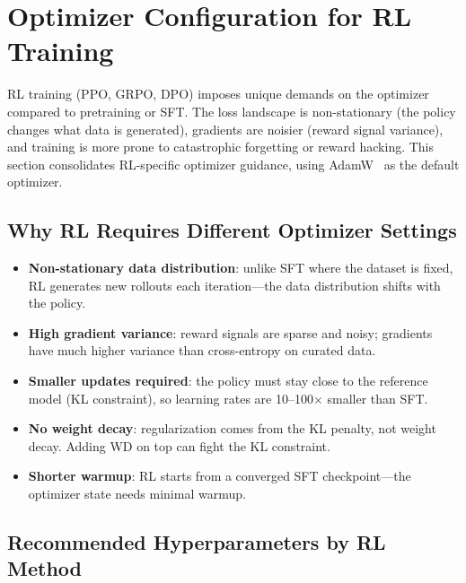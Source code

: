 \section{Optimizer Configuration for RL Training}
\label{sec:rl-optimizer-config}

RL training (PPO, GRPO, DPO) imposes unique demands on the optimizer compared to pretraining or SFT. The loss landscape is non-stationary (the policy changes what data is generated), gradients are noisier (reward signal variance), and training is more prone to catastrophic forgetting or reward hacking. This section consolidates RL-specific optimizer guidance, using AdamW~\cite{loshchilov2019adamw} as the default optimizer.

\subsection{Why RL Requires Different Optimizer Settings}
\label{why-rl-requires-different-optimizer-settings}

\begin{keybox}
\begin{itemize}
  \item \textbf{Non-stationary data distribution}: unlike SFT where the dataset is fixed, RL generates new rollouts each iteration---the data distribution shifts with the policy.
  \item \textbf{High gradient variance}: reward signals are sparse and noisy; gradients have much higher variance than cross-entropy on curated data.
  \item \textbf{Smaller updates required}: the policy must stay close to the reference model (KL constraint), so learning rates are 10--100$\times$ smaller than SFT.
  \item \textbf{No weight decay}: regularization comes from the KL penalty, not weight decay. Adding WD on top can fight the KL constraint.
  \item \textbf{Shorter warmup}: RL starts from a converged SFT checkpoint---the optimizer state needs minimal warmup.
\end{itemize}
\end{keybox}

\subsection{Recommended Hyperparameters by RL Method}
\label{recommended-hyperparameters-by-rl-method}

